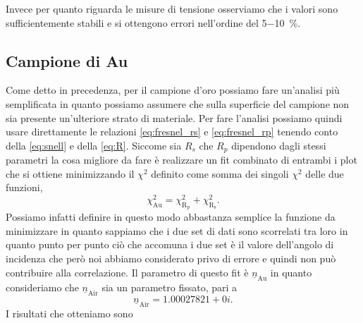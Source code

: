 \documentclass[
    prb,altaffilletter,citeautoscript,
    amsmath,amssymb,
    showpacs,showkeys,floatfix,
    reprint
]{revtex4-1}
\begin{document}
Invece per quanto riguarda le misure di tensione osserviamo che i valori sono sufficientemente stabili e si ottengono errori nell'ordine del \SI[parse-numbers=false]{5-10}{\%}. 

\subsection{Campione di Au}
Come detto in precedenza, per il campione d'oro possiamo fare un'analisi più semplificata in quanto possiamo assumere che sulla superficie del campione non sia presente un'ulteriore strato di materiale. Per fare l'analisi possiamo quindi usare direttamente le relazioni \eqref{eq:fresnel_rs} e \eqref{eq:fresnel_rp} tenendo conto della \eqref{eq:snell} e della \eqref{eq:R}. Siccome sia $R_{s}$ che $R_{p}$ dipendono dagli stessi parametri la cosa migliore da fare è realizzare un fit combinato di entrambi i plot che si ottiene minimizzando il $\chi^2$ definito come somma dei singoli $\chi^2$ delle due funzioni, \begin{equation}
    \chi^2_\mathrm{Au} = \chi^2_\mathrm{R_p} + \chi^2_\mathrm{R_s}.
\end{equation} Possiamo infatti definire in questo modo abbastanza semplice la funzione da minimizzare in quanto sappiamo che i due set di dati sono scorrelati tra loro in quanto punto per punto ciò che accomuna i due set è il valore dell'angolo di incidenza che però noi abbiamo considerato privo di errore e quindi non può contribuire alla correlazione. Il parametro di questo fit è $\underline n_\text{Au}$ in quanto consideriamo che $\underline n_\text{Air}$ sia un parametro fissato, pari a \[\underline n_\text{Air} = \num{1.00027821} + 0i.\] I risultati che otteniamo sono 

\appendix


\end{document}
